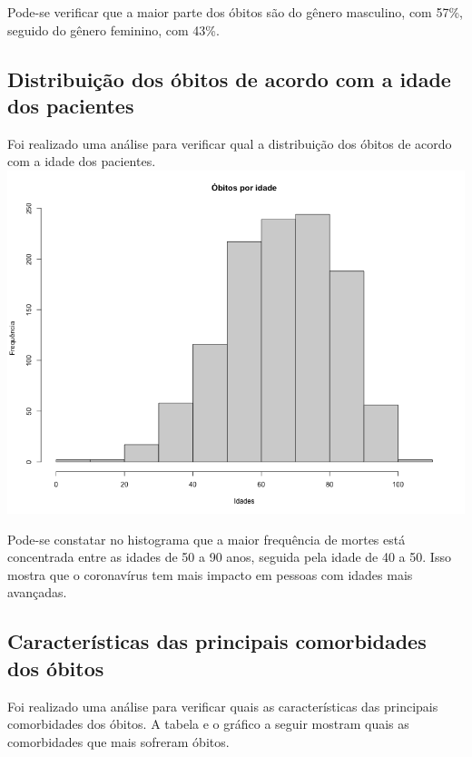 \documentclass[
]{article}
\begin{document}
Pode-se verificar que a maior parte dos óbitos são do gênero masculino,
com 57\%, seguido do gênero feminino, com 43\%.

\hypertarget{distribuiuxe7uxe3o-dos-uxf3bitos-de-acordo-com-a-idade-dos-pacientes}{%
\subsection{Distribuição dos óbitos de acordo com a idade dos
pacientes}\label{distribuiuxe7uxe3o-dos-uxf3bitos-de-acordo-com-a-idade-dos-pacientes}}

Foi realizado uma análise para verificar qual a distribuição dos óbitos
de acordo com a idade dos pacientes.
\includegraphics{../graficos/histograma_obitos_por_idade.png}

Pode-se constatar no histograma que a maior frequência de mortes está
concentrada entre as idades de 50 a 90 anos, seguida pela idade de 40 a
50. Isso mostra que o coronavírus tem mais impacto em pessoas com idades
mais avançadas.

\hypertarget{caracteruxedsticas-das-principais-comorbidades-dos-uxf3bitos}{%
\subsection{Características das principais comorbidades dos
óbitos}\label{caracteruxedsticas-das-principais-comorbidades-dos-uxf3bitos}}

Foi realizado uma análise para verificar quais as características das
principais comorbidades dos óbitos. A tabela e o gráfico a seguir
mostram quais as comorbidades que mais sofreram óbitos.
\end{document}
